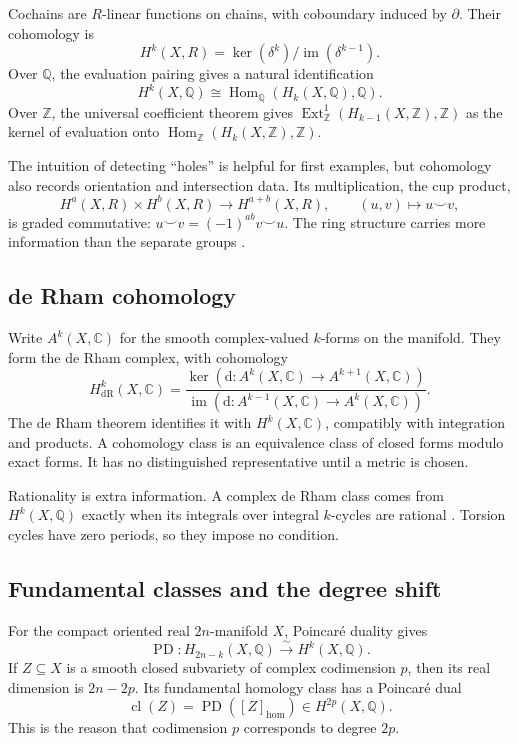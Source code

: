 \documentclass[11pt,reqno]{amsart}
\theoremstyle{definition}
\theoremstyle{remark}
\numberwithin{equation}{section}
\newcommand{\C}{\mathbb{C}}
\newcommand{\Z}{\mathbb{Z}}
\newcommand{\Q}{\mathbb{Q}}
\newcommand{\dd}{\mathrm{d}}
\DeclareMathOperator{\cl}{cl}
\DeclareMathOperator{\PD}{PD}
\DeclareMathOperator{\im}{im}
\DeclareMathOperator{\Hom}{Hom}
\begin{document}
Cochains are $R$-linear functions on chains, with coboundary induced by
$\partial$. Their cohomology is
\[
 H^k(X,R)=\ker(\delta^k)/\im(\delta^{k-1}).
\]
Over $\Q$, the evaluation pairing gives a natural identification
\[
 H^k(X,\Q)\cong\Hom_{\Q}(H_k(X,\Q),\Q).
\]
Over $\Z$, the universal coefficient theorem gives
$\operatorname{Ext}^1_{\Z}(H_{k-1}(X,\Z),\Z)$ as the kernel of evaluation
onto $\Hom_{\Z}(H_k(X,\Z),\Z)$.

The intuition of detecting ``holes'' is helpful for first examples, but
cohomology also records orientation and intersection data. Its multiplication,
the cup product,
\[
 H^a(X,R)\times H^b(X,R)\longrightarrow H^{a+b}(X,R),
 \qquad (u,v)\longmapsto u\smile v,
\]
is graded commutative: $u\smile v=(-1)^{ab}v\smile u$. The ring structure
carries more information than the separate groups \cite{hatcher2002}.

\subsection{de Rham cohomology}

Write $A^k(X,\C)$ for the smooth complex-valued $k$-forms on the manifold.
They form the de Rham complex, with cohomology
\[
 H^k_{\mathrm{dR}}(X,\C)
 =\frac{\ker(\dd:A^k(X,\C)\to A^{k+1}(X,\C))}
 {\im(\dd:A^{k-1}(X,\C)\to A^k(X,\C))}.
\]
The de Rham theorem identifies it with $H^k(X,\C)$, compatibly with
integration and products. A cohomology class is an equivalence class of
closed forms modulo exact forms. It has no distinguished representative
until a metric is chosen.

Rationality is extra information. A complex de Rham class comes from
$H^k(X,\Q)$ exactly when its integrals over integral $k$-cycles are rational
\cite{griffithsharris1978}. Torsion cycles have zero periods, so they impose no condition.

\subsection{Fundamental classes and the degree shift}

For the compact oriented real $2n$-manifold $X$, Poincar\'e duality gives
\[
 \PD:H_{2n-k}(X,\Q)\xrightarrow{\sim}H^k(X,\Q).
\]
If $Z\subseteq X$ is a smooth closed subvariety of complex codimension $p$,
then its real dimension is $2n-2p$. Its fundamental homology class has a
Poincar\'e dual
\begin{equation}\label{eq:cyclePD}
 \cl(Z)=\PD([Z]_{\mathrm{hom}})\in H^{2p}(X,\Q).
\end{equation}
This is the reason that codimension $p$ corresponds to degree $2p$.
\end{document}
